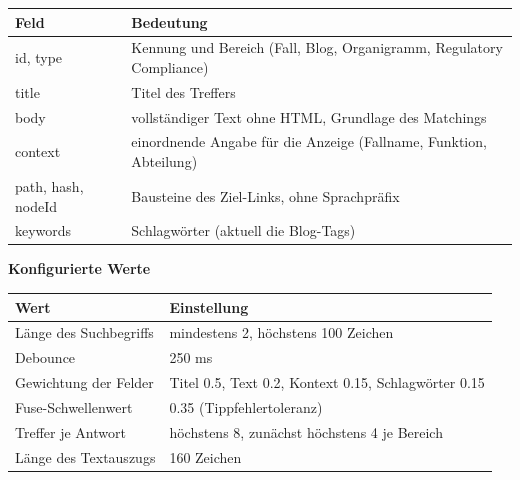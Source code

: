 \documentclass[11pt,a4paper]{article}
\newcommand{\minihead}[1]{\par\needspace{5\baselineskip}\noindent\textbf{#1}\par\nobreak}
\begin{document}
\begin{center}
\small
\begin{tabularx}{\textwidth}{>{\ttfamily}l X}
\toprule
\textnormal{\textbf{Feld}} & \textbf{Bedeutung} \\
\midrule
id, type & Kennung und Bereich (Fall, Blog, Organigramm, Regulatory Compliance) \\
\midrule
title & Titel des Treffers \\
\midrule
body & vollständiger Text ohne HTML, Grundlage des Matchings \\
\midrule
context & einordnende Angabe für die Anzeige (Fallname, Funktion, Abteilung) \\
\midrule
path, hash, nodeId & Bausteine des Ziel-Links, ohne Sprachpräfix \\
\midrule
keywords & Schlagwörter (aktuell die Blog-Tags) \\
\bottomrule
\end{tabularx}
\end{center}

\minihead{Konfigurierte Werte}
\begin{center}
\small
\begin{tabularx}{\textwidth}{l X}
\toprule
\textbf{Wert} & \textbf{Einstellung} \\
\midrule
Länge des Suchbegriffs & mindestens 2, höchstens 100 Zeichen \\
\midrule
Debounce & 250 ms \\
\midrule
Gewichtung der Felder & Titel 0.5, Text 0.2, Kontext 0.15, Schlagwörter 0.15 \\
\midrule
Fuse-Schwellenwert & 0.35 (Tippfehlertoleranz) \\
\midrule
Treffer je Antwort & höchstens 8, zunächst höchstens 4 je Bereich \\
\midrule
Länge des Textauszugs & 160 Zeichen \\
\bottomrule
\end{tabularx}
\end{center}
\end{document}
